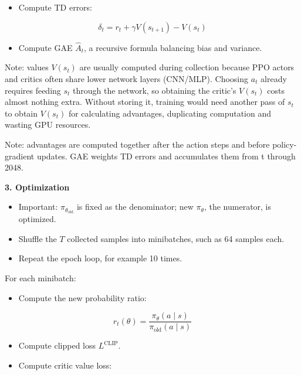 \begin{itemize}
\tightlist
\item
{}
  Compute TD errors:
\end{itemize}

\[
\delta_t=r_t+\gamma V(s_{t+1})-V(s_t)
\]

\begin{itemize}
\tightlist
\item
  Compute GAE \(\hat{A}_t\), a recursive formula balancing bias and variance.
\end{itemize}

Note: values \(V(s_t)\) are usually computed during collection because PPO actors and critics often share lower network layers (CNN/MLP). Choosing \(a_t\) already requires feeding \(s_t\) through the network, so obtaining the critic's \(V(s_t)\) costs almost nothing extra. Without storing it, training would need another pass of \(s_t\) to obtain \(V(s_t)\) for calculating advantages, duplicating computation and wasting GPU resources.

Note: advantages are computed together after the action steps and before policy-gradient updates. GAE weights TD errors and accumulates them from t through 2048.

\textbf{3. Optimization}

\begin{itemize}
\tightlist
\item
  Important: \(\pi_{\theta_{\mathrm{old}}}\) is fixed as the denominator; new \(\pi_\theta\), the numerator, is optimized.
\item
  Shuffle the \(T\) collected samples into minibatches, such as 64 samples each.
\item
  Repeat the epoch loop, for example 10 times.
\end{itemize}

For each minibatch:

\begin{itemize}
\tightlist
\item
{}
  Compute the new probability ratio:
\end{itemize}

\[
r_t(\theta)=\frac{\pi_\theta(a\mid s)}{\pi_{\mathrm{old}}(a\mid s)}
\]

\begin{itemize}
\tightlist
\item
  Compute clipped loss \(L^{\mathrm{CLIP}}\).
\item
{}
  Compute critic value loss:
\end{itemize}


